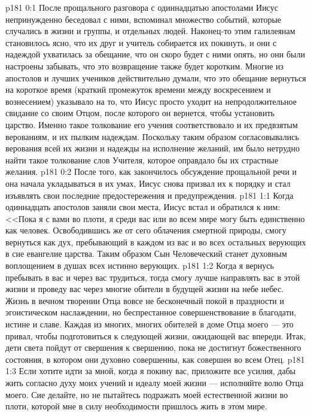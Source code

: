 \vs p181 0:1 После прощального разговора с одиннадцатью апостолами Иисус непринужденно беседовал с ними, вспоминал множество событий, которые случались в жизни и группы, и отдельных людей. Наконец\hyp{}то этим галилеянам становилось ясно, что их друг и учитель собирается их покинуть, и они с надеждой ухватилась за обещание, что он скоро будет с ними опять, но они были настроены забывать, что это возвращение также будет коротким. Многие из апостолов и лучших учеников действительно думали, что это обещание вернуться на короткое время (краткий промежуток времени между воскресением и вознесением) указывало на то, что Иисус просто уходит на непродолжительное свидание со своим Отцом, после которого он вернется, чтобы установить царство. Именно такое толкование его учения соответствовало и их предвзятым верованиям, и их пылким надеждам. Поскольку таким образом согласовывались верования всей их жизни и надежды на исполнение желаний, им было нетрудно найти такое толкование слов Учителя, которое оправдало бы их страстные желания.
\vs p181 0:2 После того, как закончилось обсуждение прощальной речи и она начала укладываться в их умах, Иисус снова призвал их к порядку и стал изъявлять свои последние предостережения и предупреждения.
\vs p181 1:1 Когда одиннадцать апостолов заняли свои места, Иисус встал и обратился к ним: <<Пока я с вами во плоти, я среди вас или во всем мире могу быть единственно как человек. Освободившись же от сего облачения смертной природы, смогу вернуться как дух, пребывающий в каждом из вас и во всех остальных верующих в сие евангелие царства. Таким образом Сын Человеческий станет духовным воплощением в душах всех истинно верующих.
\vs p181 1:2 Когда я вернусь пребывать в вас и через вас трудиться, тогда смогу лучше направлять вас в этой жизни и проведу вас через многие обители в будущей жизни на небе небес. Жизнь в вечном творении Отца вовсе не бесконечный покой в праздности и эгоистическом наслаждении, но беспрестанное совершенствование в благодати, истине и славе. Каждая из многих, многих обителей в доме Отца моего --- это привал, чтобы подготовиться к следующей жизни, ожидающей вас впереди. Итак, дети света пойдут от свершения к свершению, пока не достигнут божественного состояния, в котором они духовно совершенны, как совершен во всем Отец.
\vs p181 1:3 Если хотите идти за мной, когда я покину вас, приложите все усилия, дабы жить согласно духу моих учений и идеалу моей жизни --- исполняйте волю Отца моего. Сие делайте, но не пытайтесь подражать моей естественной жизни во плоти, которой мне в силу необходимости пришлось жить в этом мире.
